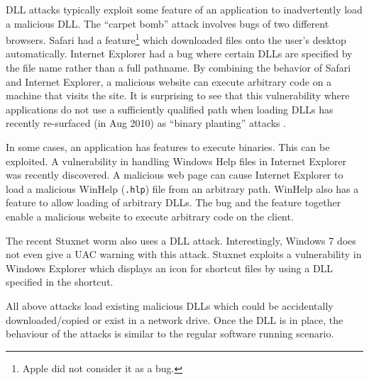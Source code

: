 DLL attacks typically exploit some feature of an application
to inadvertently load a malicious DLL.
The ``carpet bomb'' \cite{safari1} attack involves bugs of two different
browsers.
Safari had a feature\footnote{
Apple did not consider it as a bug.
}
which downloaded files onto the user's desktop automatically.
Internet Explorer had a bug where certain DLLs are specified
by the file name rather than a full pathname.
By combining the behavior of Safari and Internet Explorer,
a malicious website can execute arbitrary code on a machine 
that visits the site.
It is surprising to see that this vulnerability where applications
do not use a sufficiently qualified path when loading DLLs
has recently re-surfaced
(in Aug 2010) as ``binary planting'' attacks \cite{binary-planting}.

In some cases, an application has features to execute binaries.
This can be exploited.
A vulnerability \cite{winhelp} in handling Windows Help files in
Internet Explorer was recently discovered.
A malicious web page can cause Internet Explorer to load a malicious
WinHelp ({\tt .hlp}) file from an arbitrary path.
WinHelp also has a feature to allow loading of arbitrary DLLs.
The bug and the feature together enable a malicious website to execute
arbitrary code on the client.

The recent Stuxnet worm \cite{stuxnet} also uses a DLL attack.
Interestingly, Windows 7 does not even give a UAC warning with this attack.
Stuxnet exploits a vulnerability in Windows Explorer which displays an icon
for shortcut files by using a DLL specified in the shortcut.

All above attacks load existing malicious DLLs which could be accidentally
downloaded/copied or exist in a network drive.
Once the DLL is in place, the behaviour of the attacks is similar to the
regular software running scenario.
